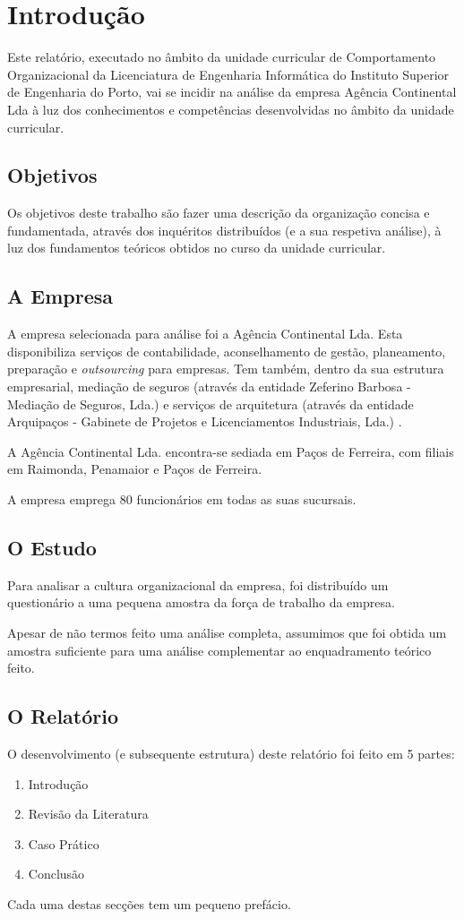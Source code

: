 
\section{Introdução}

Este relatório, executado no âmbito da unidade curricular de Comportamento Organizacional da Licenciatura de Engenharia Informática do Instituto Superior de Engenharia do Porto, vai se incidir na análise da empresa Agência Continental Lda à luz dos conhecimentos e competências desenvolvidas no âmbito da unidade curricular.

\subsection{Objetivos}

Os objetivos deste trabalho são fazer uma descrição da organização concisa e fundamentada, através dos inquéritos distribuídos (e a sua respetiva análise), à luz dos fundamentos teóricos obtidos no curso da unidade curricular.

\subsection{A Empresa}
A empresa selecionada para análise foi a Agência Continental Lda. Esta disponibiliza serviços de contabilidade, aconselhamento de gestão, planeamento, preparação e \textit{outsourcing} para empresas. Tem também, dentro da sua estrutura empresarial, mediação de seguros (através da entidade Zeferino Barbosa - Mediação de Seguros, Lda.) e serviços de arquitetura (através da entidade Arquipaços - Gabinete de Projetos e Licenciamentos Industriais, Lda.) \parencite{agenciacontinental}.

A Agência Continental Lda. encontra-se sediada em Paços de Ferreira, com filiais em Raimonda, Penamaior e Paços de Ferreira.

A empresa emprega 80 funcionários em todas as suas sucursais.

\subsection{O Estudo}

Para analisar a cultura organizacional da empresa, foi distribuído um questionário a uma pequena amostra da força de trabalho da empresa.

Apesar de não termos feito uma análise completa, assumimos que foi obtida um amostra suficiente para uma análise complementar ao enquadramento teórico feito.

\subsection{O Relatório}

O desenvolvimento (e subsequente estrutura) deste relatório foi feito em 5 partes:

\begin{enumerate}
	\item Introdução
	\item Revisão da Literatura
	\item Caso Prático
	\item Conclusão
\end{enumerate}

Cada uma destas secções tem um pequeno prefácio.
